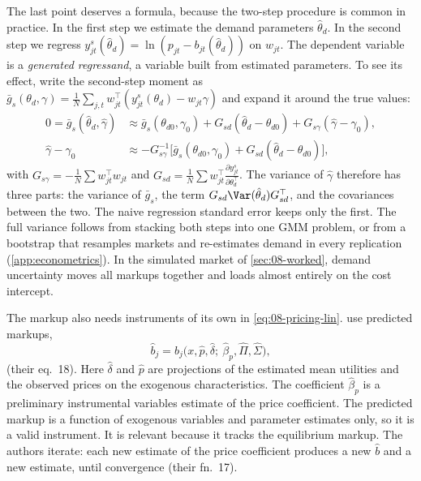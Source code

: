 The last point deserves a formula, because the two-step procedure is common in practice. In the first step we
estimate the demand parameters $\hat\theta_d$. In the second step we regress $y^s_{jt}(\hat\theta_d) =
\ln(p_{jt} - b_{jt}(\hat\theta_d))$ on $w_{jt}$. The dependent variable is a \emph{generated regressand}, a variable
built from estimated parameters. To see its effect, write the second-step moment as
$\bar g_s(\theta_d, \gamma) = \frac{1}{N}\sum_{j,t} w^\top_{jt}(y^s_{jt}(\theta_d) - w_{jt}\gamma)$ and expand it
around the true values:
\begin{align*}
  0 = \bar g_s(\hat\theta_d, \hat\gamma)
  &\approx \bar g_s(\theta_{d0}, \gamma_0) + G_{sd}(\hat\theta_d - \theta_{d0}) + G_{s\gamma}(\hat\gamma - \gamma_0), \\
  \hat\gamma - \gamma_0 &\approx -G_{s\gamma}^{-1}\big[\bar g_s(\theta_{d0}, \gamma_0) + G_{sd}(\hat\theta_d -
  \theta_{d0})\big],
\end{align*}
with $G_{s\gamma} = -\frac{1}{N}\sum w^\top_{jt}w_{jt}$ and $G_{sd} = \frac{1}{N}\sum w^\top_{jt}\frac{\partial
y^s_{jt}}{\partial\theta_d^\top}$. The variance of $\hat\gamma$ therefore has three parts: the variance of
$\bar g_s$, the term $G_{sd}\Var(\hat\theta_d)G_{sd}^\top$, and the covariances between the two. The naive
regression standard error keeps only the first. The full variance follows from stacking both steps into one GMM
problem, or from a bootstrap that resamples markets and re-estimates demand in every replication
(\cref{app:econometrics}). In the simulated market of \cref{sec:08-worked}, demand uncertainty moves all markups
together and loads almost entirely on the cost intercept.

The markup also needs instruments of its own in \eqref{eq:08-pricing-lin}. \citet[p.~92]{BerryLevinsohnPakes2004}
use predicted markups,
\begin{equation}\label{eq:08-markup-iv}
  \hat b_j = b_j\big(x, \hat p, \hat\delta;\ \hat\beta_p, \hat\Pi, \hat\Sigma\big),
\end{equation}
(their eq.~18). Here $\hat\delta$ and $\hat p$ are projections of the estimated mean utilities and the observed
prices on the exogenous characteristics. The coefficient $\hat\beta_p$ is a preliminary instrumental variables estimate
of the price coefficient. The predicted markup is a function of exogenous variables and parameter estimates only, so it is a
valid instrument. It is relevant because it tracks the equilibrium markup. The authors iterate: each new estimate of the
price coefficient produces a new $\hat b$ and a new estimate, until convergence (their fn.~17).

